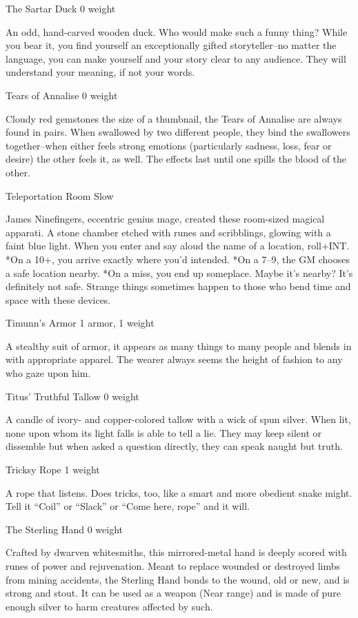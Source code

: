  The Sartar Duck 0 weight


 An odd, hand-carved wooden duck. Who would make such a funny thing? While you bear it, you find yourself an exceptionally gifted storyteller--no matter the language, you can make yourself and your story clear to any audience. They will understand your meaning, if not your words.


 Tears of Annalise 0 weight


 Cloudy red gemstones the size of a thumbnail, the Tears of Annalise are always found in pairs. When swallowed by two different people, they bind the swallowers together--when either feels strong emotions (particularly sadness, loss, fear or desire) the other feels it, as well. The effects last until one spills the blood of the other.


 Teleportation Room Slow


 James Ninefingers, eccentric genius mage, created these room-sized magical apparati. A stone chamber etched with runes and scribblings, glowing with a faint blue light. When you enter and say aloud the name of a location, roll+INT. *On a 10+, you arrive exactly where you'd intended. *On a 7--9, the GM chooses a safe location nearby. *On a miss, you end up someplace. Maybe it's nearby? It's definitely not safe. Strange things sometimes happen to those who bend time and space with these devices.


 Timunn's Armor 1 armor, 1 weight


 A stealthy suit of armor, it appears as many things to many people and blends in with appropriate apparel. The wearer always seems the height of fashion to any who gaze upon him.


 Titus' Truthful Tallow 0 weight


 A candle of ivory- and copper-colored tallow with a wick of spun silver. When lit, none upon whom its light falls is able to tell a lie. They may keep silent or dissemble but when asked a question directly, they can speak naught but truth.


 Tricksy Rope 1 weight


 A rope that listens. Does tricks, too, like a smart and more obedient snake might. Tell it ``Coil'' or ``Slack'' or ``Come here, rope'' and it will. 


 The Sterling Hand 0 weight


 Crafted by dwarven whitesmiths, this mirrored-metal hand is deeply scored with runes of power and rejuvenation. Meant to replace wounded or destroyed limbs from mining accidents, the Sterling Hand bonds to the wound, old or new, and is strong and stout. It can be used as a weapon (Near range) and is made of pure enough silver to harm creatures affected by such.


